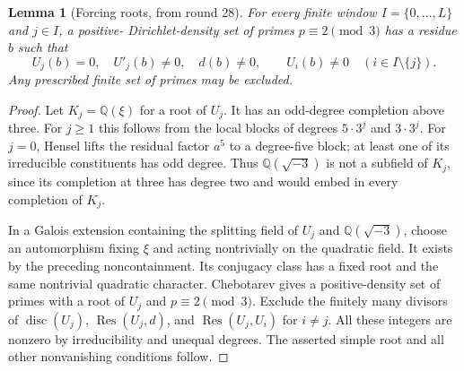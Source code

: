 \documentclass[11pt,a4paper]{article}
\newtheorem{lemma}[theorem]{Lemma}
\theoremstyle{definition}\newtheorem{definition}[theorem]{Definition}
\theoremstyle{remark}\newtheorem{remark}[theorem]{Remark}
\begin{document}
\begin{lemma}[Forcing roots, from round 28]\label{pis:fac:forcing}
For every finite window $I=\{0,\ldots,L\}$ and $j\in I$, a positive-
Dirichlet-density set of primes $p\equiv2\pmod3$ has a residue $b$ such
that
\[
 U_j(b)=0,\quad U'_j(b)\ne0,\quad d(b)\ne0,
 \qquad U_i(b)\ne0\quad(i\in I\setminus\{j\}).
\]
Any prescribed finite set of primes may be excluded.
\end{lemma}
\begin{proof}
Let $K_j=\mathbb Q(\xi)$ for a root of $U_j$. It has an odd-degree
completion above three. For $j\ge1$ this follows from the local blocks
of degrees $5\cdot3^j$ and $3\cdot3^j$. For $j=0$, Hensel lifts the
residual factor $a^5$ to a degree-five block; at least one of its
irreducible constituents has odd degree. Thus
$\mathbb Q(\sqrt{-3})$ is not a subfield of $K_j$, since its completion
at three has degree two and would embed in every completion of $K_j$.

In a Galois extension containing the splitting field of $U_j$ and
$\mathbb Q(\sqrt{-3})$, choose an automorphism fixing $\xi$ and acting
nontrivially on the quadratic field. It exists by the preceding
noncontainment. Its conjugacy class has a fixed root and the same
nontrivial quadratic character. Chebotarev gives a positive-density
set of primes with a root of $U_j$ and $p\equiv2\pmod3$.
Exclude the finitely many divisors of $\operatorname{disc}(U_j)$,
$\operatorname{Res}(U_j,d)$, and
$\operatorname{Res}(U_j,U_i)$ for $i\ne j$. All these integers are
nonzero by irreducibility and unequal degrees. The asserted simple
root and all other nonvanishing conditions follow.
\end{proof}
\end{document}
